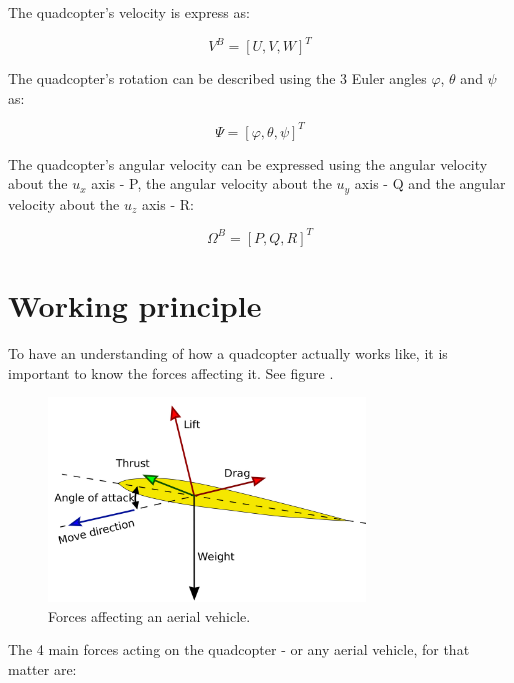 The quadcopter's velocity is express as:

\begin{equation}
	V^{B}=[U, V, W] ^{T}
\end{equation} 

The quadcopter's rotation can be described using the 3 Euler angles $\varphi$, $\theta$ and $\psi$ as:

\begin{equation}
	\Psi=[\varphi, \theta, \psi] ^{T}
\end{equation} 

The quadcopter's angular velocity can be expressed using the angular velocity about the $u_{x}$ axis - P, the angular velocity about the $u_{y}$ axis - Q and the angular velocity about the $u_{z}$ axis - R:

\begin{equation}
	\Omega^{B}=[P, Q, R] ^{T}
\end{equation} 

\section{Working principle}

To have an understanding of how a quadcopter actually works like, it is important to know the forces affecting it. See figure \label{droneForces}.

\begin{figure}[H]
  \centering
    \includegraphics[width=0.75\textwidth]{images/forces.png}
	\caption{Forces affecting an aerial vehicle.}
	\label{droneForces}
\end{figure}


The 4 main forces acting on the quadcopter - or any aerial vehicle, for that matter are:

